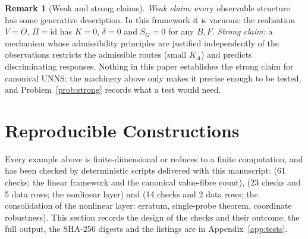 \documentclass[11pt,a4paper]{article}
\newcommand{\id}{\mathrm{id}}
\newcommand{\defic}{\delta}
\theoremstyle{plain}
\theoremstyle{definition}
\newtheorem{remark}[theorem]{Remark}
\begin{document}
\begin{remark}[Weak and strong claims]\label{rem:weakstrong}
\emph{Weak claim:} every observable structure has some generative description. In this framework it is vacuous: the realisation $V=O$, $\Pi=\id$ has $K=0$, $\defic=0$ and $S_G=0$ for any $B,F$.
\emph{Strong claim:} a mechanism whose admissibility principles are justified independently of the observations restricts the admissible routes (small $K_A$) and predicts discriminating responses. Nothing in this paper establishes the strong claim for canonical UNNS; the machinery above only makes it precise enough to be tested, and Problem~\ref{prob:strong} records what a test would need.
\end{remark}
\section{Reproducible Constructions}\label{sec:repro}
Every example above is finite-dimensional or reduces to a finite computation, and has been checked by deterministic scripts delivered with this manuscript:  (61 checks; the linear framework and the canonical value-fibre count),  (23 checks and 5 data rows; the nonlinear layer) and  (14 checks and 2 data rows; the consolidation of the nonlinear layer: erratum, single-probe theorem, coordinate robustness). This section records the design of the checks and their outcome; the full output, the SHA-256 digests and the listings are in Appendix~\ref{app:tests}.
\end{document}
